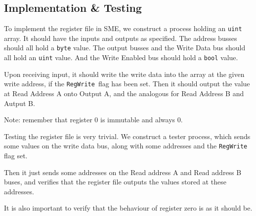 \documentclass{beamer}
\begin{document}
\subsection{Implementation \& Testing}
\begin{frame}
    To implement the register file in SME, we construct a process holding an
    \texttt{uint} array. It should have the inputs and outputs as specified.
    The address busses should all hold a \texttt{byte} value. The output busses
    and the Write Data bus should all hold an \texttt{uint} value. And the
    Write Enabled bus should hold a \texttt{bool} value.

    \vspace{\baselineskip}
    Upon receiving input, it should write the write data into the array at the
    given write address, if the \texttt{RegWrite} flag has been set. Then it
    should output the value at Read Address A onto Output A, and the analogous
    for Read Address B and Autput B.

    \vspace{\baselineskip}
    Note: remember that register 0 is immutable and always 0.
\end{frame}
\begin{frame}
    Testing the register file is very trivial. We construct a tester process,
    which sends some values on the write data bus, along with some addresses
    and the \texttt{RegWrite} flag set.

    \vspace{\baselineskip}
    Then it just sends some addresses on the Read address A and Read address B
    buses, and verifies that the register file outputs the values stored at
    these addresses.

    \vspace{\baselineskip}
    It is also important to verify that the behaviour of register zero is as it
    should be.
\end{frame}
\end{document}
